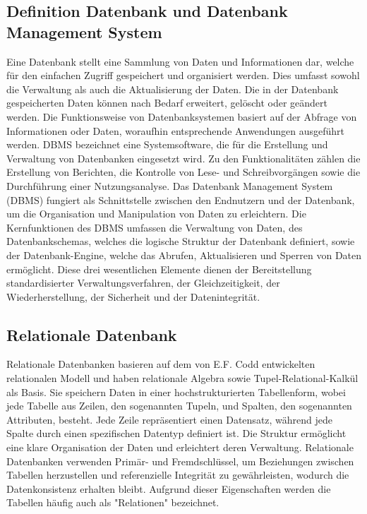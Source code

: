 \subsection{Definition Datenbank und Datenbank Management System} %
\label{sec:definitiondatenbank}
Eine Datenbank stellt eine Sammlung von Daten und Informationen dar, welche für den einfachen Zugriff gespeichert und organisiert werden. Dies umfasst sowohl die Verwaltung als auch die Aktualisierung der Daten. Die in der Datenbank gespeicherten Daten können nach Bedarf erweitert, gelöscht oder geändert werden. Die Funktionsweise von Datenbanksystemen basiert auf der Abfrage von Informationen oder Daten, woraufhin entsprechende Anwendungen ausgeführt werden. DBMS bezeichnet eine Systemsoftware, die für die Erstellung und Verwaltung von Datenbanken eingesetzt wird. Zu den Funktionalitäten zählen die Erstellung von Berichten, die Kontrolle von Lese- und Schreibvorgängen sowie die Durchführung einer Nutzungsanalyse. Das Datenbank Management System (DBMS) fungiert als Schnittstelle zwischen den Endnutzern und der Datenbank, um die Organisation und Manipulation von Daten zu erleichtern. Die Kernfunktionen des DBMS umfassen die Verwaltung von Daten, des Datenbankschemas, welches die logische Struktur der Datenbank definiert, sowie der Datenbank-Engine, welche das Abrufen, Aktualisieren und Sperren von Daten ermöglicht. Diese drei wesentlichen Elemente dienen der Bereitstellung standardisierter Verwaltungsverfahren, der Gleichzeitigkeit, der Wiederherstellung, der Sicherheit und der Datenintegrität. \citep{9677042}


\subsection{Relationale Datenbank} %
\label{sec:relationaleDatenbanken}
Relationale Datenbanken basieren auf dem von E.F. Codd entwickelten relationalen Modell und haben relationale Algebra sowie Tupel-Relational-Kalkül als Basis. Sie speichern Daten in einer hochstrukturierten Tabellenform, wobei jede Tabelle aus Zeilen, den sogenannten Tupeln, und Spalten, den sogenannten Attributen, besteht. Jede Zeile repräsentiert einen Datensatz, während jede Spalte durch einen spezifischen Datentyp definiert ist. Die Struktur ermöglicht eine klare Organisation der Daten und erleichtert deren Verwaltung. Relationale Datenbanken verwenden Primär- und Fremdschlüssel, um Beziehungen zwischen Tabellen herzustellen und referenzielle Integrität zu gewährleisten, wodurch die Datenkonsistenz erhalten bleibt. Aufgrund dieser Eigenschaften werden die Tabellen häufig auch als "Relationen" bezeichnet. 

